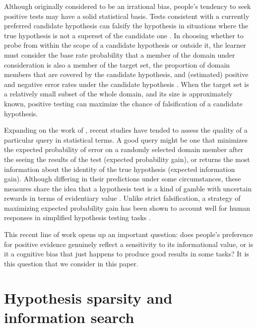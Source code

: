 \documentclass[10pt,letterpaper]{article}
\begin{document}
Although originally considered to be an irrational bias, people's tendency to seek positive tests may have a solid statistical basis. Tests consistent with a currently preferred candidate hypothesis can falsify the hypothesis in situations where the true hypothesis is not a superset of the candidate one \cite{klayman1987confirmation}. In choosing whether to probe from within the scope of a candidate hypothesis or outside it, the learner must consider the base rate probability that a member of the domain under consideration is also a member of the target set, the proportion of domain members that are covered by the candidate hypothesis, and (estimated) positive and negative error rates under the candidate hypothesis \cite{klayman1987confirmation}. When the target set is a relatively small subset of the whole domain, and its size is approximately known, positive testing can maximize the chance of falsification of a candidate hypothesis.

Expanding on the work of , recent studies have tended to assess the quality of a particular query in statistical terms. A good query might be one that minimizes the expected probability of error on a randomly selected domain member after the seeing the results of the test (expected probability gain), or returns the most information about the identity of the true hypothesis (expected information gain). Although differing in their predictions under some circumstances, these measures share the idea that a hypothesis test is a kind of gamble with uncertain rewards in terms of evidentiary value \cite{poletiek2000gambles}. Unlike strict falsification, a strategy of maximizing expected probability gain has been shown to account well for human responses in simplified hypothesis testing tasks \cite{nelson2010probgain}. 

This recent line of work opens up an important question: does people's preference for positive evidence genuinely reflect a sensitivity to its informational value, or is it a cognitive bias that just happens to produce good results in some tasks? It is this question that we consider in this paper.


\section{Hypothesis sparsity and information search}
\end{document}
